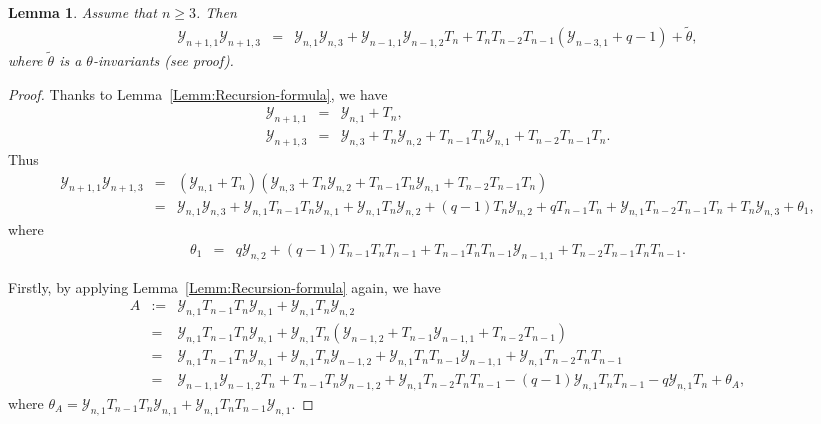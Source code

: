 \documentclass[13pt,a4paper, oneside]{amsart}       %
\numberwithin{equation}{section}
\newtheorem{lemma}[equation]{Lemma}
\theoremstyle{definition}
\theoremstyle{remark}
\begin{document}
\begin{CJK*}{GBK}{song}
\begin{lemma}\label{Lemm:13-recursion}
Assume that $n\geq 3$.  Then
\begin{eqnarray*}
 \mathscr{Y}_{n+1,1}\mathscr{Y}_{n+1,3} &=&\mathscr{Y}_{n,1}\mathscr{Y}_{n,3}+\mathscr{Y}_{n-1,1}
\mathscr{Y}_{n-1,2}T_n+T_nT_{n-2}T_{n-1}
(\mathscr{Y}_{n-3,1}+q-1)+\tilde{\theta},
\end{eqnarray*}
where $\tilde{\theta}$ is a $\theta$-invariants (see proof).
\end{lemma}
\begin{proof}Thanks to Lemma~\ref{Lemm:Recursion-formula},  we have
  \begin{eqnarray*}
 \mathscr{Y}_{n+1,1} &=&\mathscr{Y}_{n,1}+T_n,\\
 \mathscr{Y}_{n+1,3} &=&\mathscr{Y}_{n,3}+T_n\mathscr{Y}_{n,2}+
 T_{n-1}T_n\mathscr{Y}_{n,1}+T_{n-2}T_{n-1}T_n.
  \end{eqnarray*}
  Thus
  \begin{eqnarray*}
 \mathscr{Y}_{n\!+\!1,1}\mathscr{Y}_{n\!+\!1,3}\!\!&=&\!
(\mathscr{Y}_{n,1}+T_n)
 (\mathscr{Y}_{n,3}+T_n\mathscr{Y}_{n,2}+
 T_{n-1}T_n\mathscr{Y}_{n,1}+T_{n-2}T_{n-1}T_n)\\
\!\!&=&\!\!\mathscr{Y}_{n,1}\mathscr{Y}_{n,3}
 \!+\!\mathscr{Y}_{n,1}T_{n\!-\!1}T_n\mathscr{Y}_{n,1}\!+\!
 \mathscr{Y}_{n,1}T_n\mathscr{Y}_{n,2}\!+\!(\!q\!-\!1\!)T_n\mathscr{Y}_{n,2}
\!+\!qT_{n\!-\!1}T_n\!+\!
 \mathscr{Y}_{n,1}T_{n\!-\!2}T_{n\!-\!1}T_n\!+\! T_n\mathscr{Y}_{n,3}\!+\!\theta_1,\end{eqnarray*}
 where
\begin{eqnarray*}
\theta_1&=&q\mathscr{Y}_{n,2}+(q-1)T_{n-1}T_nT_{n-1}+
T_{n-1}T_nT_{n-1}\mathscr{Y}_{n-1,1}+T_{n-2}T_{n-1}T_nT_{n-1}.
\end{eqnarray*}

Firstly, by applying Lemma~\ref{Lemm:Recursion-formula} again, we have
 \begin{eqnarray*}
A&:=&\mathscr{Y}_{n,1}T_{n\!-\!1}T_n\mathscr{Y}_{n,1}+
\mathscr{Y}_{n,1}T_n\mathscr{Y}_{n,2}\\
\!\!&=&\!\!\mathscr{Y}_{n,1}T_{n\!-\!1}T_n\mathscr{Y}_{n,1}+\mathscr{Y}_{n,1}T_n (\mathscr{Y}_{n-1,2}+T_{n-1}\mathscr{Y}_{n-1,1}+T_{n-2}T_{n-1})\\
 \!\!&=&\!\mathscr{Y}_{n,1}T_{n\!-\!1}T_n\mathscr{Y}_{n,1}+\mathscr{Y}_{n,1}T_n\mathscr{Y}_{n-1,2}+\mathscr{Y}_{n,1}
T_nT_{n-1}\mathscr{Y}_{n-1,1}+\mathscr{Y}_{n,1}T_{n-2}T_nT_{n-1}\\
\!\!&=&\!\!\mathscr{Y}_{n\!-\!1,1}
\mathscr{Y}_{n\!-\!1,2}T_n\!+\!T_{n\!-\!1}T_n\mathscr{Y}_{n\!-\!1,2}\!+\!
\mathscr{Y}_{n,1}T_{n\!-\!2}T_nT_{n\!-\!1}\!-\!
(q\!-\!1)\mathscr{Y}_{n,1}T_nT_{n\!-\!1}\!-\!q\mathscr{Y}_{n,1}T_n+\theta_A,
\end{eqnarray*}
where $\theta_A=\mathscr{Y}_{n,1}T_{n\!-\!1}T_n\mathscr{Y}_{n,1}+
\mathscr{Y}_{n,1}T_nT_{n\!-\!1}\mathscr{Y}_{n,1}$.


\end{proof}
\end{CJK*}
\end{document}
